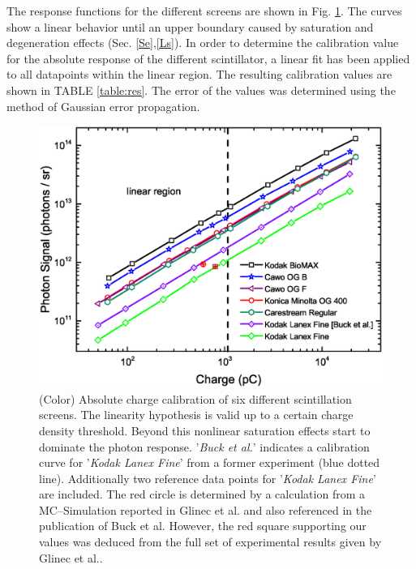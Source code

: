 \documentclass[%
preprint,
amsmath,
amssymb,
aip,
rsi, 
numerical,
floatfix,
]{revtex4-1}
\begin{document}


The response functions for the different screens are shown in Fig. \ref{fig:Calib}.
The curves show a linear behavior until an upper boundary caused by saturation and degeneration effects (Sec. \ref{Se},\ref{Ls}).  
In order to determine the calibration value for the absolute response of the different scintillator, a linear fit has been applied to all datapoints within the linear region.
The resulting calibration values are shown in TABLE \ref{table:res}. 
The error of the values was determined using the method of Gaussian error propagation.
   
\begin{figure}
\includegraphics[width=\textwidth]{./Figures/Absolute}%
\caption{\label{fig:Calib}(Color) Absolute charge calibration of six different scintillation screens.
The linearity hypothesis is valid up to a certain charge density threshold. Beyond this nonlinear saturation effects start to dominate the photon response.
'\textit{Buck et al.}' indicates a calibration curve for '\textit{Kodak Lanex Fine}' from a former experiment \cite{Buck2010} (blue dotted line).
Additionally two reference data points for '\textit{Kodak Lanex Fine}' are included. 
The red circle is determined by a calculation from a MC--Simulation reported in Glinec et al. \cite{Glinec2006} and also referenced in the publication of Buck et al. 
However, the red square supporting our values was deduced from the full set of experimental results given by Glinec et al.. }
\end{figure}
\end{document}
